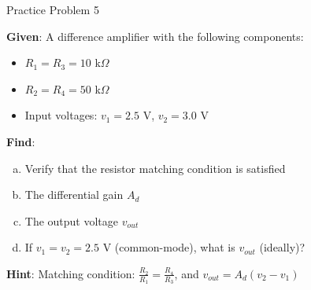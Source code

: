 \documentclass[10pt, aspectratio=169]{beamer}
\newif\ifshowsolutions
\begin{document}
\begin{frame}{Practice Problem 5}
    
    \textbf{Given}: A difference amplifier with the following components:
    \begin{itemize}
        \item $R_1 = R_3 = 10$ k$\Omega$
        \item $R_2 = R_4 = 50$ k$\Omega$
        \item Input voltages: $v_1 = 2. 5$ V, $v_2 = 3.0$ V
    \end{itemize}
    
    \vspace{0.3cm}
    
    \textbf{Find}: 
    \begin{enumerate}[(a)]
        \item Verify that the resistor matching condition is satisfied
        \item The differential gain $A_d$
        \item The output voltage $v_{out}$
        \item If $v_1 = v_2 = 2.5$ V (common-mode), what is $v_{out}$ (ideally)?
    \end{enumerate}
    
    \vspace{0.5cm}
    
    \textbf{Hint}:  Matching condition: $\frac{R_2}{R_1} = \frac{R_4}{R_3}$, and $v_{out} = A_d(v_2 - v_1)$
    
\end{frame}

\ifshowsolutions
\begin{frame}{Practice Problem 5 Solution}
    
    \textbf{Given}: $R_1 = R_3 = 10$ k$\Omega$, $R_2 = R_4 = 50$ k$\Omega$
    
    \textbf{Inputs}:  $v_1 = 2.5$ V, $v_2 = 3.0$ V
    
    \vspace{0.3cm}
    
    \textbf{Solutions}:
    
    (a) Check matching condition:
    \[
    \frac{R_2}{R_1} = \frac{50}{10} = 5, \quad \frac{R_4}{R_3} = \frac{50}{10} = 5
    \]
    
    (b) Differential gain:
    \[
    A_d = \frac{R_2}{R_1} = \frac{50}{10} = \boxed{5}
    \]
    
    (c) Output voltage:
    \[
    v_{out} = A_d(v_2 - v_1) = 5(3.0 - 2.5) = 5(0.5) = \boxed{2.5 \text{ V}}
    \]
    
    (d) Common-mode input ($v_1 = v_2$):
    \[
    v_{out} = A_d(v_2 - v_1) = 5(2.5 - 2.5) = \boxed{0 \text{ V}}
    \]
    
\end{frame}
\fi
\end{document}
